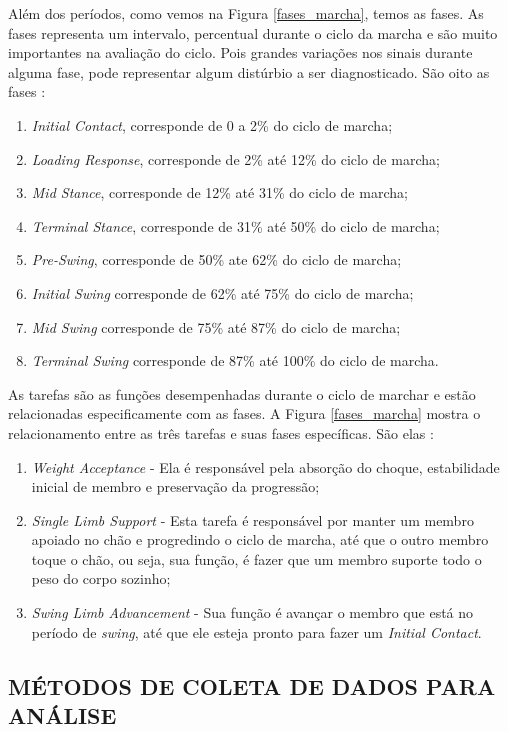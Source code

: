 Além dos períodos, como vemos na Figura \ref{fases_marcha}, temos as fases. As fases representa um intervalo, percentual durante o ciclo da marcha e são muito importantes na avaliação do ciclo. 
Pois grandes variações nos sinais durante alguma fase, pode representar algum distúrbio a ser diagnosticado. São oito as fases \cite{Perry2010}:
\begin{enumerate}
	\item \emph{Initial Contact}, corresponde de 0 a 2\% do ciclo de marcha;
	\item \emph{Loading Response}, corresponde de 2\% até 12\% do ciclo de marcha;
	\item \emph{Mid Stance}, corresponde de 12\% até 31\% do ciclo de marcha;
	\item \emph{Terminal Stance}, corresponde de 31\% até 50\% do ciclo de marcha;
	\item \emph{Pre-Swing}, corresponde de 50\% ate 62\% do ciclo de marcha;
	\item \emph{Initial Swing} corresponde de 62\% até 75\% do ciclo de marcha;
	\item \emph{Mid Swing} corresponde de 75\% até 87\% do ciclo de marcha;
	\item \emph{Terminal Swing} corresponde de 87\% até 100\% do ciclo de marcha. 
\end{enumerate}


As tarefas são as funções desempenhadas durante o ciclo de marchar e estão relacionadas especificamente com as fases. 
A Figura \ref{fases_marcha} mostra o relacionamento entre as três tarefas e suas fases específicas. São elas \cite{Perry2010}:
\begin{enumerate}
	\item \emph{Weight Acceptance} - Ela é responsável pela absorção do choque, estabilidade inicial de membro e preservação da progressão;
	\item \emph{Single Limb Support} - Esta tarefa é responsável por manter um membro apoiado no chão e progredindo o ciclo de marcha, até que o outro membro toque o chão, ou seja, sua função, é fazer que um membro suporte todo o peso do corpo sozinho;
	\item \emph{Swing Limb Advancement} - Sua função é avançar o membro que está no período de \emph{swing}, até que ele esteja pronto para fazer um \emph{Initial Contact}.
\end{enumerate}

\subsection{MÉTODOS DE COLETA DE DADOS PARA ANÁLISE} 
\label{metodos_analise}

